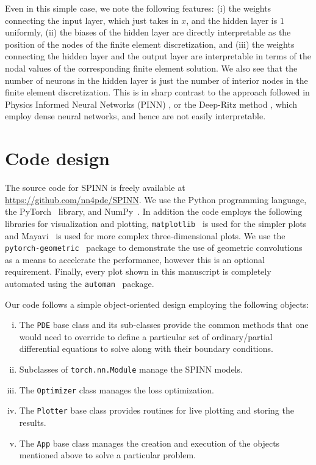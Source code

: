 \documentclass[12pt]{article}
\begin{document}
Even in this simple case, we note the following features: (i) the weights connecting the input layer, which just takes in $x$, and the hidden layer is $1$ uniformly, (ii) the biases of the hidden layer are directly interpretable as the position of the nodes of the finite element discretization, and (iii) the weights connecting the hidden layer and the output layer are interpretable in terms of the nodal values of the corresponding finite element solution. We also see that the number of neurons in the hidden layer is just the number of interior nodes in the finite element discretization. This is in sharp contrast to the approach followed in Physics Informed Neural Networks (PINN) \cite{RPK2019}, or the Deep-Ritz method \cite{EYu2018}, which employ dense neural networks, and hence are not easily interpretable.

\section{Code design}

\begin{sloppypar}
The source code for SPINN is freely available at \url{https://github.com/nn4pde/SPINN}.  We use the Python programming language, the PyTorch~\cite{pytorch} library, and NumPy~\cite{numpy}.  In addition the code employs the following libraries for visualization and plotting, \verb|matplotlib|~\cite{mpl} is used for the simpler plots and Mayavi~\cite{mayavi} is used for more complex three-dimensional plots.  We use the \verb|pytorch-geometric|~\cite{pytorch_geometric} package to demonstrate the use of geometric convolutions as a means to accelerate the performance, however this is an optional requirement.  Finally, every plot shown in this manuscript is completely automated using the \verb|automan|~\cite{automan:2018} package.
\end{sloppypar}

Our code follows a simple object-oriented design employing the following objects:
\begin{enumerate}[(i)]
\item The \verb|PDE| base class and its sub-classes provide the common methods that one would need to override to define a particular set of ordinary/partial differential equations to solve along with their boundary conditions.
\item Subclasses of \verb|torch.nn.Module| manage the SPINN models.
\item The \verb|Optimizer| class manages the loss optimization.
\item The \verb|Plotter| base class provides routines for live plotting and storing the results.
\item The \verb|App| base class manages the creation and execution of the objects mentioned above to solve a particular problem.
\end{enumerate}
\end{document}
